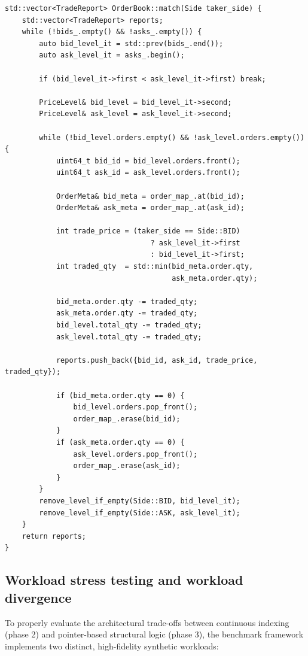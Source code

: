 \documentclass[11pt,a4paper]{article}
\begin{document}
\begin{lstlisting}[caption={Phase 3 matching logic
(\texttt{orderbook.cpp})}]
std::vector<TradeReport> OrderBook::match(Side taker_side) {
    std::vector<TradeReport> reports;
    while (!bids_.empty() && !asks_.empty()) {
        auto bid_level_it = std::prev(bids_.end());
        auto ask_level_it = asks_.begin();

        if (bid_level_it->first < ask_level_it->first) break;

        PriceLevel& bid_level = bid_level_it->second;
        PriceLevel& ask_level = ask_level_it->second;

        while (!bid_level.orders.empty() && !ask_level.orders.empty()) {
            uint64_t bid_id = bid_level.orders.front();
            uint64_t ask_id = ask_level.orders.front();

            OrderMeta& bid_meta = order_map_.at(bid_id);
            OrderMeta& ask_meta = order_map_.at(ask_id);

            int trade_price = (taker_side == Side::BID)
                                  ? ask_level_it->first
                                  : bid_level_it->first;
            int traded_qty  = std::min(bid_meta.order.qty,
                                       ask_meta.order.qty);

            bid_meta.order.qty -= traded_qty;
            ask_meta.order.qty -= traded_qty;
            bid_level.total_qty -= traded_qty;
            ask_level.total_qty -= traded_qty;

            reports.push_back({bid_id, ask_id, trade_price, traded_qty});

            if (bid_meta.order.qty == 0) {
                bid_level.orders.pop_front();
                order_map_.erase(bid_id);
            }
            if (ask_meta.order.qty == 0) {
                ask_level.orders.pop_front();
                order_map_.erase(ask_id);
            }
        }
        remove_level_if_empty(Side::BID, bid_level_it);
        remove_level_if_empty(Side::ASK, ask_level_it);
    }
    return reports;
}
\end{lstlisting}

\subsection{Workload stress testing and workload divergence}

To properly evaluate the architectural trade-offs between continuous
indexing (phase 2) and pointer-based structural logic (phase 3), the
benchmark framework implements two distinct, high-fidelity synthetic
workloads:
\end{document}
